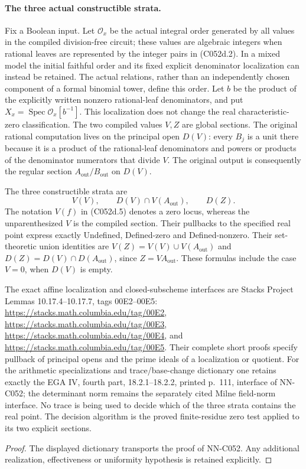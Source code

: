 \begin{geometricstatement}[NN-C052]
\paragraph{The three actual constructible strata.}
Fix a Boolean input. Let \(\mathcal O_x\) be the actual integral
order generated by all values in the compiled division-free circuit;
these values are algebraic integers when rational leaves are represented
by the integer pairs in (C052d.2). In a mixed model the initial faithful
order and its fixed explicit denominator localization can instead be
retained. The actual relations, rather than an independently chosen
component of a formal binomial tower, define this order. Let \(b\) be
the product of the explicitly written nonzero rational-leaf denominators,
and put \(X_x=\operatorname{Spec}\mathcal O_x[b^{-1}]\). This
localization does not change the real characteristic-zero classification.
The two compiled values \(V,Z\) are global sections. The original
rational computation lives on the principal open \(D(V)\): every
\(B_j\) is a unit there because it is a product of the rational-leaf
denominators and powers or products of the denominator numerators
that divide \(V\). The original output is consequently the regular
section \(A_{\mathrm{out}}/B_{\mathrm{out}}\) on \(D(V)\).

The three constructible strata are
\[
        V(V),\qquad D(V)\cap V(A_{\mathrm{out}}),\qquad D(Z).
                                                                    \tag{C052d.5}
\]
The notation \(V(f)\) in (C052d.5) denotes a zero locus, whereas the
unparenthesized \(V\) is the compiled section. Their pullbacks to the
specified real point express exactly Undefined, Defined-zero and
Defined-nonzero. Their set-theoretic union identities are
\(V(Z)=V(V)\cup V(A_{\mathrm{out}})\) and
\(D(Z)=D(V)\cap D(A_{\mathrm{out}})\), since \(Z=VA_{\mathrm{out}}\).
These formulas include the case \(V=0\), when \(D(V)\) is empty.

The exact affine localization and closed-subscheme interfaces are
Stacks Project Lemmas 10.17.4--10.17.7, tags 00E2--00E5:
\url{https://stacks.math.columbia.edu/tag/00E2},
\url{https://stacks.math.columbia.edu/tag/00E3},
\url{https://stacks.math.columbia.edu/tag/00E4}, and
\url{https://stacks.math.columbia.edu/tag/00E5}.
Their complete short proofs specify pullback of principal opens and
the prime ideals of a localization or quotient. For the arithmetic
specializations and trace/base-change dictionary one retains exactly
the EGA IV, fourth part, 18.2.1--18.2.2, printed p.~111, interface
of NN-C052; the determinant norm remains the separately cited Milne
field-norm interface. No trace is being used to decide which of the
three strata contains the real point. The decision algorithm is the
proved finite-residue zero test applied to its two explicit sections.
\end{geometricstatement}
\begin{proof} The displayed dictionary transports the proof of NN-C052. Any additional realization, effectiveness or uniformity hypothesis is retained explicitly.\end{proof}


